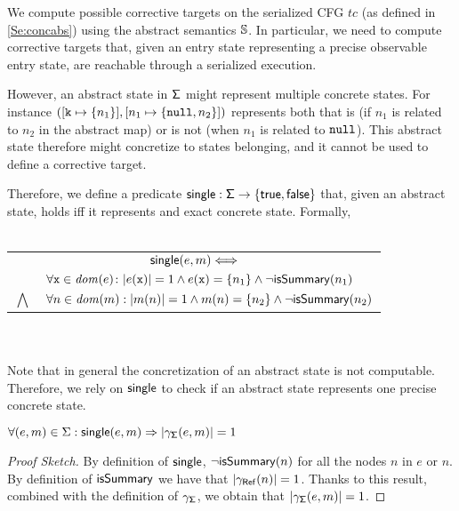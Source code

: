 We compute possible corrective targets on the serialized CFG $tc$ (as defined in \ref{Se:concabs}) using the abstract semantics $\mathbb{S}$. In particular, we need to compute corrective targets that, given an entry state representing a precise observable entry state, are reachable through a serialized execution. 

However, an abstract state in $\mathsf{\Sigma}$ might represent multiple concrete states. For instance $([\mathtt{k} \mapsto \{n_1\}], [n_1 \mapsto \{\mathtt{null}, n_2\}])$ represents both that   is (if $n_1$ is related to $n_2$ in the abstract map) or is not (when $n_1$ is related to $\mathtt{null}$). This abstract state therefore might concretize to states belonging, and it cannot be used to define a corrective target.

Therefore, we define a predicate $\mathsf{single} : \mathsf{\Sigma} \to \{\mathsf{true}, \mathsf{false}\}$ that, given an abstract state, holds iff it represents and exact concrete state. Formally,\\\\
\footnotesize
\begin{tabular}{r@{}l@{}}
	\multicolumn{2}{c}{$\mathsf{single}(e, m) \Longleftrightarrow$} \\
	& $\forall \mathtt{x} \in \mathit{dom}(e) \colon |e(\mathtt{x})|=1 \land e(\mathtt{x})=\{n_1\} \land \neg \mathsf{isSummary}(n_1)$ \\
	$\bigwedge$ & $\forall n \in \mathit{dom}(m) : |m(n)|=1 \land m(n)=\{n_2\} \land \neg \mathsf{isSummary}(n_2)$
\end{tabular}
\normalsize\\\\
Note that in general the concretization of an abstract state is not computable. Therefore, we rely on $\mathsf{single}$ to check if an abstract state represents one precise concrete state.

\begin{lemma}
	\label{lemma:singleconcretization}
	$\forall (e, m) \in \Sigma : \mathsf{single}(e, m) \Rightarrow |\gamma_{\mathsf{\Sigma}}(e, m)|=1$
\begin{proof}[Proof Sketch]
 By definition of $\mathsf{single}$, $\neg \mathsf{isSummary}(n)$ for all the nodes $n$ in $e$ or $n$. By definition of $\mathsf{isSummary}$ we have that $|\gamma_{\mathsf{Ref}}(n)|=1$. Thanks to this result, combined with the definition of $\gamma_{\mathsf{\Sigma}}$, we obtain that $|\gamma_{\mathsf{\Sigma}}(e, m)|=1$.
\end{proof}
\end{lemma}

